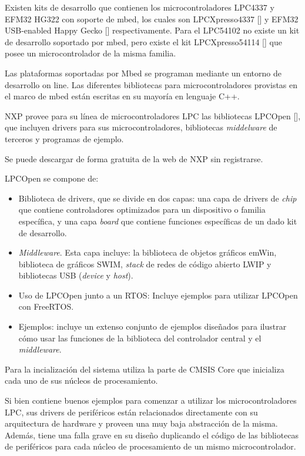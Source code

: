 Existen kits de desarrollo que contienen los microcontroladores LPC4337 y EFM32 HG322 con soporte de mbed, los cuales son LPCXpresso4337 [] y EFM32 USB-enabled Happy Gecko [] respectivamente. Para el LPC54102 no existe un kit de desarrollo soportado por mbed, pero existe el kit LPCXpresso54114 [] que posee un  microcontrolador de la misma familia.

Las plataformas soportadas por Mbed se programan mediante un entorno de desarrollo on line. Las diferentes bibliotecas para microcontroladores provistas en el marco de mbed están escritas en su mayoría en lenguaje C++.


NXP provee para su línea de microcontroladores LPC las bibliotecas LPCOpen [], que incluyen drivers para sus microcontroladores, bibliotecas \emph{middelware} de terceros y programas de ejemplo. 

Se puede descargar de forma gratuita de la web de NXP sin registrarse.

LPCOpen se compone de:

\begin{itemize}
\item
Biblioteca de drivers, que se divide en dos capas: una capa de drivers de \emph{chip} que contiene controladores optimizados para un dispositivo o familia específica, y una capa \emph{board} que contiene funciones específicas de un dado kit de desarrollo.
\item
\emph{Middleware}. Esta capa incluye: la biblioteca de objetos gráficos emWin, biblioteca de gráficos SWIM, \emph{stack} de redes de código abierto LWIP y bibliotecas USB (\emph{device} y \emph{host}).
\item
Uso de LPCOpen junto a un RTOS: Incluye ejemplos para utilizar LPCOpen con FreeRTOS.
\item
Ejemplos: incluye un extenso conjunto de ejemplos diseñados para ilustrar cómo usar las funciones de la biblioteca del controlador central y el \emph{middleware}.
\end{itemize}

Para la incialización del sistema utiliza la parte de CMSIS Core que inicializa cada uno de sus núcleos de procesamiento.

Si bien contiene buenos ejemplos para comenzar a utilizar los microcontroladores LPC, sus drivers de periféricos están relacionados directamente con su arquitectura de hardware y proveen una muy baja abstracción de la misma. Además, tiene una falla grave en su diseño duplicando el código de las bibliotecas de periféricos para cada núcleo de procesamiento de un mismo microcontrolador.

